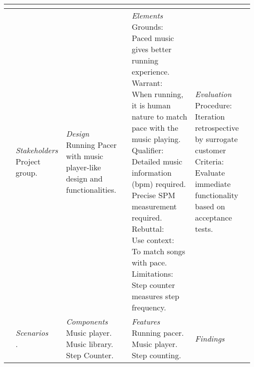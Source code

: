 \begin{table}
\begin{tabular}{l|l|l|l|l}
{   } \\ \hline
\parbox[t][5cm][c]{0.02\textwidth}{}
	& \parbox[t]{0.20\textwidth}{\small 
    \textit{Stakeholders} \newline
    Project group.
	}
	& \parbox[t]{0.20\textwidth}{\small 
		\textit{Design} \newline
	 	Running Pacer with music player-like design and functionalities.  
	}
	& \parbox[t]{0.20\textwidth}{\tiny
		\textit{\small  Elements} \newline
		Grounds: \newline
		Paced music gives better running experience. \newline
		Warrant: \newline
		When running, it is human nature to match pace with the music playing. \newline
		Qualifier: \newline
		Detailed music information (bpm) required. Precise SPM measurement required. \newline
		Rebuttal: \newline
		Use context: \newline
		To match songs with pace. \newline
		Limitations: \newline
		Step counter measures step frequency.
	}
	& \parbox[t]{0.20\textwidth}{\small 
		\textit{Evaluation} \newline
		Procedure: \newline Iteration retrospective by surrogate customer \newline
		Criteria: \newline Evaluate immediate functionality based on acceptance tests.
	}\\ \hline
\parbox[t][3.5cm][c]{0.02\textwidth}{}
	& \parbox[t]{0.20\textwidth}{\small 
		\textit{Scenarios}\newline
		.
	}
	& \parbox[t]{0.20\textwidth}{\small 
		\textit{Components}\newline
		Music player. \newline
		Music library. \newline
		Step Counter.
		
	}
	& \parbox[t]{0.20\textwidth}{\small 
		\textit{Features}\newline
		Running pacer.\newline
		Music player.\newline
		Step counting.
	}
	& \parbox[t]{0.20\textwidth}{\small 
		\textit{Findings}
	}\\ \hline     
\end{tabular}
\end{table}